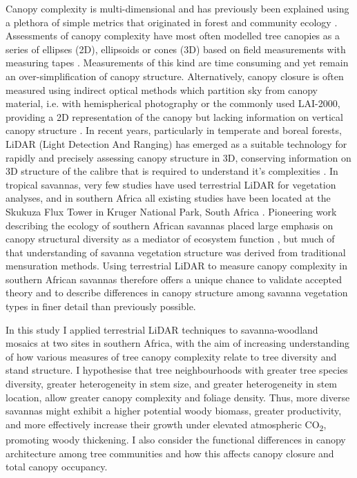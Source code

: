 \begin{refsection}
Canopy complexity is multi-dimensional and has previously been explained using a plethora of simple metrics that originated in forest and community ecology \citep{Kershaw2017}. Assessments of canopy complexity have most often modelled tree canopies as a series of ellipses (2D), ellipsoids or cones (3D) based on field measurements with measuring tapes \citep{Jucker2015}. Measurements of this kind are time consuming and yet remain an over-simplification of canopy structure. Alternatively, canopy closure is often measured using indirect optical methods which partition sky from canopy material, i.e. with hemispherical photography or the commonly used LAI-2000, providing a 2D representation of the canopy but lacking information on vertical canopy structure \citep{Jonckheere2004}. In recent years, particularly in temperate and boreal forests, LiDAR (Light Detection And Ranging) has emerged as a suitable technology for rapidly and precisely assessing canopy structure in 3D, conserving information on 3D structure of the calibre that is required to understand it's complexities \citep{Muir2018, Calders2020}. In tropical savannas, very few studies have used terrestrial LiDAR for vegetation analyses, and in southern Africa all existing studies have been located at the Skukuza Flux Tower in Kruger National Park, South Africa \citep{Muumbe2021}. Pioneering work describing the ecology of southern African savannas placed large emphasis on canopy structural diversity as a mediator of ecosystem function \citep{Solbrig1996}, but much of that understanding of savanna vegetation structure was derived from traditional mensuration methods. Using terrestrial LiDAR to measure canopy complexity in southern African savannas therefore offers a unique chance to validate accepted theory and to describe differences in canopy structure among savanna vegetation types in finer detail than previously possible.

In this study I applied terrestrial LiDAR techniques to savanna-woodland mosaics at two sites in southern Africa, with the aim of increasing understanding of how various measures of tree canopy complexity relate to tree diversity and stand structure. I hypothesise that tree neighbourhoods with greater tree species diversity, greater heterogeneity in stem size, and greater  heterogeneity in stem location, allow greater canopy complexity and foliage density. Thus, more diverse savannas might exhibit a higher potential woody biomass, greater productivity, and more effectively increase their growth under elevated atmospheric CO\textsubscript{2}, promoting woody thickening. I also consider the functional differences in canopy architecture among tree communities and how this affects canopy closure and total canopy occupancy.


\end{refsection}
